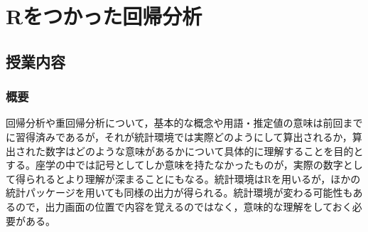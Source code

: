 \section{Rをつかった回帰分析}
\label{b09_Regression_onR}

\subsection{授業内容}
\subsubsection{概要}
回帰分析や重回帰分析について，基本的な概念や用語・推定値の意味は前回までに習得済みであるが，それが統計環境では実際どのようにして算出されるか，算出された数字はどのような意味があるかについて具体的に理解することを目的とする。座学の中では記号としてしか意味を持たなかったものが，実際の数字として得られるとより理解が深まることにもなる。統計環境はRを用いるが，ほかの統計パッケージを用いても同様の出力が得られる。統計環境が変わる可能性もあるので，出力画面の位置で内容を覚えるのではなく，意味的な理解をしておく必要がある。
